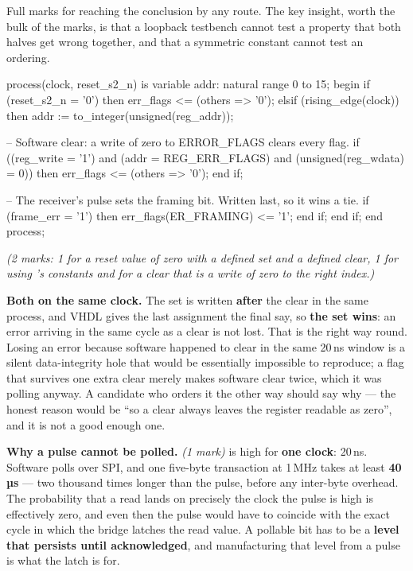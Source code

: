Full marks for reaching the conclusion by any route. The key insight, worth the bulk of the marks, is
that a loopback testbench cannot test a property that both halves get wrong together, and that a
symmetric constant cannot test an ordering.


\begin{vhdlcode}
process(clock, reset_s2_n) is
    variable addr: natural range 0 to 15;
begin
    if (reset_s2_n = '0') then
        err_flags <= (others => '0');
    elsif (rising_edge(clock)) then
        addr := to_integer(unsigned(reg_addr));

        -- Software clear: a write of zero to ERROR_FLAGS clears every flag.
        if ((reg_write = '1') and (addr = REG_ERR_FLAGS) and (unsigned(reg_wdata) = 0)) then
            err_flags <= (others => '0');
        end if;

        -- The receiver's pulse sets the framing bit. Written last, so it wins a tie.
        if (frame_err = '1') then
            err_flags(ER_FRAMING) <= '1';
        end if;
    end if;
end process;
\end{vhdlcode}

{\itshape (2 marks: 1 for a reset value of zero with a defined set and a defined clear, 1 for using
's constants and for a clear that is a write of zero to the right index.)\par}

\medskip
\textbf{Both on the same clock.} The set is written \textbf{after} the clear in the same process,
and VHDL gives the last assignment the final say, so \textbf{the set wins}: an error arriving in the
same cycle as a clear is not lost. That is the right way round. Losing an error because software
happened to clear in the same 20\,ns window is a silent data-integrity hole that would be essentially
impossible to reproduce; a flag that survives one extra clear merely makes software clear twice,
which it was polling anyway. A candidate who orders it the other way should say why --- the honest
reason would be ``so a clear always leaves the register readable as zero'', and it is not a good
enough one.

\textbf{Why a pulse cannot be polled.} \textit{(1 mark)}  is high for \textbf{one
clock}: 20\,ns. Software polls over SPI, and one five-byte transaction at 1\,MHz  takes at
least \textbf{40\,µs} --- two thousand times longer than the pulse, before any inter-byte overhead.
The probability that a  read lands on precisely the clock the pulse is high is
effectively zero, and even then the pulse would have to coincide with the exact cycle in which the
bridge latches the read value. A pollable bit has to be a \textbf{level that persists until
acknowledged}, and manufacturing that level from a pulse is what the latch is for.

